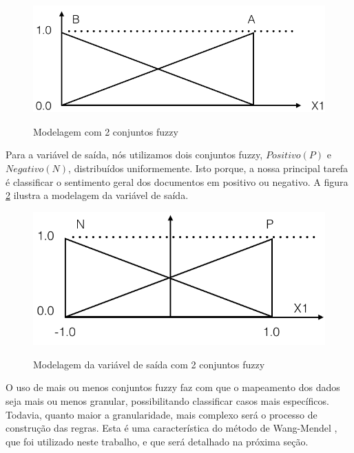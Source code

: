 \documentclass[template.tex]{subfiles}
\begin{document}
\begin{figure}[H]
\caption{Modelagem com 2 conjuntos fuzzy}
\centering
\includegraphics[scale=0.45]{conjuntos_fuzzy_entrada_final.png}
\label{figura:conjuntos_fuzzy_entrada_final}
\end{figure}

Para a variável de saída, nós utilizamos dois conjuntos fuzzy, $Positivo (P)$ e $Negativo (N)$, distribuídos uniformemente. Isto porque, a nossa principal tarefa é classificar o sentimento geral dos documentos em positivo ou negativo. A figura \ref{figura:conjuntos_fuzzy_saida} ilustra a modelagem da variável de saída.

\begin{figure}[H]
\caption{Modelagem da variável de saída com 2 conjuntos fuzzy}
\centering
\includegraphics[scale=0.45]{conjuntos_fuzzy_saida.png}
\label{figura:conjuntos_fuzzy_saida}
\end{figure}

O uso de mais ou menos conjuntos fuzzy faz com que o mapeamento dos dados seja mais ou menos granular, possibilitando classificar casos mais específicos. Todavia, quanto maior a granularidade, mais complexo será o processo de construção das regras. Esta é uma característica do método de Wang-Mendel \cite{wang1992generating}, que foi utilizado neste trabalho, e que será detalhado na próxima seção.

\end{document}
